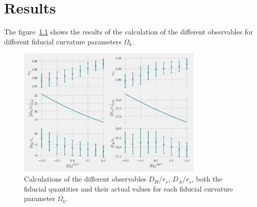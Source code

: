 \chapter{Results}
The figure~\ref{fig:DA_DH} shows the results of the calculation of the different observables for different fiducial curvature parameters $\Omega_k$. 


\begin{figure}[b]
	\centering
	\includegraphics[width=0.8\textwidth]{../figs/phase2_DA_DH_flat.pdf}
	\caption{Calculations of the different observables $D_H /r_s$, $D_A /r_s$, both the fiducial quantities and their actual values for each fiducial curvature parameter $\Omega_k$.}
	\label{fig:DA_DH}
\end{figure}

